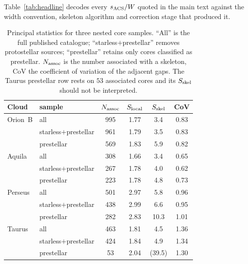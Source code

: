 \documentclass[usenatbib,twoside,twocolumn]{mnras}
\begin{document}
Table~\ref{tab:headline} decodes every $s_{\rm ACS}/W$ quoted in the main text against the width convention, skeleton algorithm and correction stage that produced it.

\begin{table}
\caption{Principal statistics for three nested core samples. ``All'' is the full published catalogue; ``starless$+$prestellar'' removes protostellar sources; ``prestellar'' retains only cores classified as prestellar. $N_{\rm assoc}$ is the number associated with a skeleton, CoV the coefficient of variation of the adjacent gaps. The Taurus prestellar row rests on $53$ associated cores and its $S_{\rm skel}$ should not be interpreted.}
\label{tab:popsplit}
\footnotesize
\setlength{\tabcolsep}{4pt}
\begin{tabular}{llcccc}
\toprule
Cloud & sample & $N_{\rm assoc}$ & $S_{\rm local}$ & $S_{\rm skel}$ & CoV \\
\midrule
Orion~B & all                  & 995 & 1.77 & 3.4 & 0.83 \\
        & starless$+$prestellar& 961 & 1.79 & 3.5 & 0.83 \\
        & prestellar           & 569 & 1.83 & 5.9 & 0.82 \\
\midrule
Aquila  & all                  & 308 & 1.66 & 3.4 & 0.65 \\
        & starless$+$prestellar& 267 & 1.78 & 4.0 & 0.62 \\
        & prestellar           & 223 & 1.78 & 4.8 & 0.73 \\
\midrule
Perseus & all                  & 501 & 2.97 & 5.8 & 0.96 \\
        & starless$+$prestellar& 438 & 2.99 & 6.6 & 0.95 \\
        & prestellar           & 282 & 2.83 & 10.3 & 1.01 \\
\midrule
Taurus  & all                  & 463 & 1.81 & 4.5 & 1.36 \\
        & starless$+$prestellar& 424 & 1.84 & 4.9 & 1.34 \\
        & prestellar           &  53 & 2.04 & (39.5) & 1.30 \\
\bottomrule
\end{tabular}
\end{table}
\end{document}
